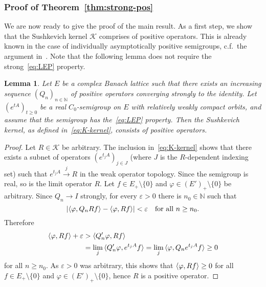 \documentclass[sn-mathphys]{sn-jnl}%
\theoremstyle{thmstyleone}
\newtheorem{lemma}[theorem]{Lemma}
\theoremstyle{thmstylethree}
\newcommand{\NN}{\mathbb{N}}
\begin{document}
\subsubsection*{Proof of Theorem~\ref{thm:strong-pos}}
We are now ready to give the proof of the main result. As a first step, we show that the Sushkevich kernel $\mathcal{K}$ comprises of positive operators. This is already known in the case of individually asymptotically positive semigroups, c.f.\ the argument in~\cite[p.\ 94]{GTh}. Note that the following lemma does not require the strong~\eqref{eq:LEP} property.
\begin{lemma}
	\label{lem:positive-K}
	Let $E$ be a complex Banach lattice such that there exists an increasing sequence $(Q_n)_{n\in\NN}$ of positive operators converging strongly to the identity. Let $(e^{tA})_{t\ge 0}$ be a real $C_0$-semigroup on $E$ with relatively weakly compact orbits, and assume that the semigroup has the~\eqref{eq:LEP} property. Then the Sushkevich kernel, as defined in~\eqref{eq:K-kernel}, consists of positive operators.
\end{lemma}
\begin{proof}
	Let $R\in\mathcal{K}$ be arbitrary. The inclusion in~\eqref{eq:K-kernel} shows that there exists a subnet of operators $(e^{t_j A})_{j\in J}$ (where $J$ is the $R$-dependent indexing set) such that $e^{t_j A} \overset{j}{\longrightarrow} R$ in the weak operator topology. Since the semigroup is real, so is the limit operator $R$. Let $f\in E_+\setminus\{0\}$ and $\varphi \in (E')_+\setminus\{0\}$ be arbitrary. Since $Q_n \to I$ strongly, for every $\varepsilon >0$ there is $n_0\in\NN$ such that
	\begin{equation*}
		\lvert\braket{\varphi, Q_n Rf}-\braket{\varphi,Rf}\rvert < \varepsilon \quad\text{for all }n \ge n_0.
	\end{equation*}
	Therefore
	\begin{align*}
		\braket{\varphi,Rf}+\varepsilon &> \braket{Q_n' \varphi, Rf} \\
		&= \lim_j \braket{Q_n'\varphi,e^{t_j A}f} = \lim_j \braket{\varphi,Q_n e^{t_j A}f} \ge 0
	\end{align*}
	for all $n\ge n_0$. As $\varepsilon>0$ was arbitrary, this shows that $\braket{\varphi, Rf}\ge 0$ for all $f\in E_+\setminus\{0\}$ and $\varphi \in (E')_+\setminus\{0\}$, hence $R$ is a positive operator.
\end{proof}
\end{document}
